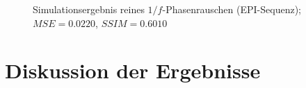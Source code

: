 \begin{figure}[H]
	\centering
	\hfill
	\caption[Simulationsergebnis reines $1/f$-Phasenrauschen (EPI) (3)]{Simulationsergebnis reines $1/f$-Phasenrauschen (EPI-Sequenz); $MSE=0.0220$, $SSIM=0.6010$}
	\label{fig:res1overFepi3}	
\end{figure}

\section{Diskussion der Ergebnisse}

















